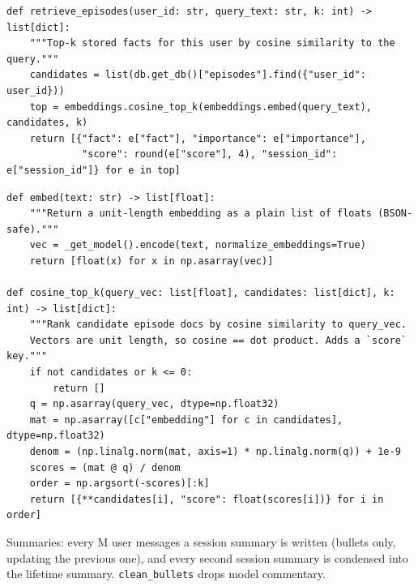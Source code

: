 \documentclass[11pt]{article}
\begin{document}
\begin{lstlisting}
def retrieve_episodes(user_id: str, query_text: str, k: int) -> list[dict]:
    """Top-k stored facts for this user by cosine similarity to the query."""
    candidates = list(db.get_db()["episodes"].find({"user_id": user_id}))
    top = embeddings.cosine_top_k(embeddings.embed(query_text), candidates, k)
    return [{"fact": e["fact"], "importance": e["importance"],
             "score": round(e["score"], 4), "session_id": e["session_id"]} for e in top]
\end{lstlisting}
\endgroup
\begingroup\lstset{basicstyle=\ttfamily\scriptsize}
\begin{lstlisting}
def embed(text: str) -> list[float]:
    """Return a unit-length embedding as a plain list of floats (BSON-safe)."""
    vec = _get_model().encode(text, normalize_embeddings=True)
    return [float(x) for x in np.asarray(vec)]

def cosine_top_k(query_vec: list[float], candidates: list[dict], k: int) -> list[dict]:
    """Rank candidate episode docs by cosine similarity to query_vec.
    Vectors are unit length, so cosine == dot product. Adds a `score` key."""
    if not candidates or k <= 0:
        return []
    q = np.asarray(query_vec, dtype=np.float32)
    mat = np.asarray([c["embedding"] for c in candidates], dtype=np.float32)
    denom = (np.linalg.norm(mat, axis=1) * np.linalg.norm(q)) + 1e-9
    scores = (mat @ q) / denom
    order = np.argsort(-scores)[:k]
    return [{**candidates[i], "score": float(scores[i])} for i in order]
\end{lstlisting}
\endgroup
Summaries: every M user messages a session summary is written (bullets only, updating the previous one), and every second session summary is condensed into the lifetime summary. \verb|clean_bullets| drops model commentary.
\end{document}
